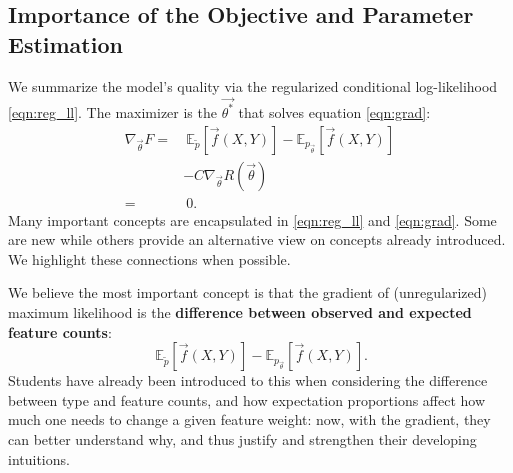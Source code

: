 \documentclass[11pt,letterpaper]{article}
\newcommand{\empirical}[0]{\ensuremath{\tilde{p}}}
\begin{document}

\subsection{Importance of the Objective and Parameter Estimation} %

We summarize the model's quality via the regularized conditional
log-likelihood \eqref{eqn:reg_ll}.  
The maximizer is the $\vec{\theta^*}$ that solves equation \eqref{eqn:grad}:
\begin{equation}
\begin{aligned}
\nabla_{\vec{\theta}} F
 = &
\ \mathbb{E}_{\empirical{}}\left[\vec{f}(X,Y)\right] 
- \mathbb{E}_{{p_{\vec{\theta}}}}\left[\vec{f}(X,Y)\right]\\
 & - C \nabla_{\vec{\theta}}R(\vec{\theta})
\label{eqn:grad} \\
 = &\ 0.
\end{aligned}
\end{equation}
Many important concepts are encapsulated in \eqref{eqn:reg_ll} and \eqref{eqn:grad}. 
Some are new while others provide an alternative view
on concepts already introduced. We highlight these connections when possible.

We believe the most important concept is that the gradient of (unregularized)
maximum likelihood is the \textbf{difference 
between observed and expected feature counts}:
\begin{equation}
\ \mathbb{E}_{\empirical{}}\left[\vec{f}(X,Y)\right] 
- \mathbb{E}_{p_{\vec{\theta}}}\left[\vec{f}(X,Y)\right].
\label{eqn:obsexp} 
\end{equation}
Students have already been introduced to this when considering the difference between type and 
feature counts, and how expectation proportions affect how much one needs to change a given feature weight: 
now, with the gradient, they can better understand why, and thus justify and strengthen their developing intuitions. 
\end{document}
